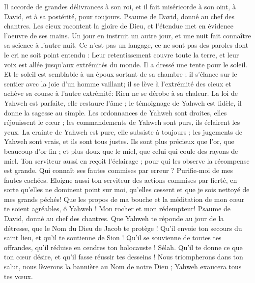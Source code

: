 \begin{multicols}{2}
Il accorde de grandes délivrances à son roi, et il fait miséricorde à son oint, à David, et à sa postérité, pour toujours.
\VerseOne{}Psaume de David, donné au chef des chantres.
Les cieux racontent la gloire de Dieu, et l'étendue met en évidence l'oeuvre de ses mains.
Un jour en instruit un autre jour, et une nuit fait connaître sa science à l'autre nuit.
Ce n'est pas un langage, ce ne sont pas des paroles dont le cri ne soit point entendu :
Leur retentissement couvre toute la terre, et leur voix est allée jusqu'aux extrémités du monde. Il a dressé une tente pour le soleil.
Et le soleil est semblable à un époux sortant de sa chambre ; il s'élance sur le sentier avec la joie d'un homme vaillant;
il se lève à l'extrémité des cieux et achève sa course à l'autre extrémité: Rien ne se dérobe à sa chaleur.
La loi de Yahweh est parfaite, elle restaure l'âme ; le témoignage de Yahweh est fidèle, il donne la sagesse au simple.
Les ordonnances de Yahweh sont droites, elles réjouissent le cœur ; les commandements de Yahweh sont purs, ils éclairent les yeux.
La crainte de Yahweh est pure, elle subsiste à toujours ; les jugements de Yahweh sont vrais, et ils sont tous justes.
Ils sont plus précieux que l'or, que beaucoup d'or fin ; et plus doux que le miel, que celui qui coule des rayons de miel.
Ton serviteur aussi en reçoit l'éclairage ; pour qui les observe la récompense est grande.
Qui connaît ses fautes commises par erreur ? Purifie-moi de mes fautes cachées.
Eloigne aussi ton serviteur des actions commises par fierté, en sorte qu'elles ne dominent point sur moi, qu'elles cessent et que je sois nettoyé de mes grands péchés!
Que les propos de ma bouche et la méditation de mon cœur te soient agréables, ô Yahweh ! Mon rocher et mon rédempteur!
\VerseOne{}Psaume de David, donné au chef des chantres.
Que Yahweh te réponde au jour de la détresse, que le Nom du Dieu de Jacob te protège !
Qu'il envoie ton secours du saint lieu, et qu'il te soutienne de Sion !
Qu'il se souvienne de toutes tes offrandes, qu'il réduise en cendres ton holocauste ! Sélah.
Qu'il te donne ce que ton cœur désire, et qu'il fasse réussir tes desseins !
Nous triompherons dans ton salut, nous lèverons la bannière au Nom de notre Dieu ; Yahweh exaucera tous tes vœux.

\end{multicols}
